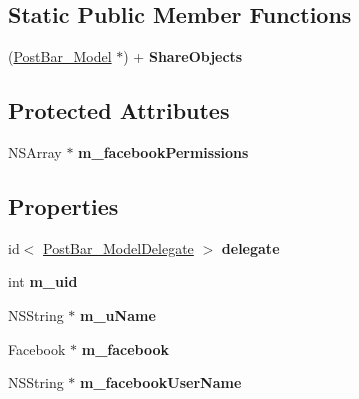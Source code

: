 \subsection*{Static Public Member Functions}
\begin{DoxyCompactItemize}
\item 
\hypertarget{interface_post_bar___model_a351fa837fa5dc9f7eb2b19f847b9f0fe}{
(\hyperlink{interface_post_bar___model}{PostBar\_\-Model} $\ast$) + {\bfseries ShareObjects}}
\label{interface_post_bar___model_a351fa837fa5dc9f7eb2b19f847b9f0fe}

\end{DoxyCompactItemize}
\subsection*{Protected Attributes}
\begin{DoxyCompactItemize}
\item 
\hypertarget{interface_post_bar___model_aaa568d989f7547276821822828e61660}{
NSArray $\ast$ {\bfseries m\_\-facebookPermissions}}
\label{interface_post_bar___model_aaa568d989f7547276821822828e61660}

\end{DoxyCompactItemize}
\subsection*{Properties}
\begin{DoxyCompactItemize}
\item 
\hypertarget{interface_post_bar___model_aada6f066df26bb88055490294526bcdd}{
id$<$ \hyperlink{protocol_post_bar___model_delegate-p}{PostBar\_\-ModelDelegate} $>$ {\bfseries delegate}}
\label{interface_post_bar___model_aada6f066df26bb88055490294526bcdd}

\item 
\hypertarget{interface_post_bar___model_a2c0d71d72d27e522f432c2cbd529b7b8}{
int {\bfseries m\_\-uid}}
\label{interface_post_bar___model_a2c0d71d72d27e522f432c2cbd529b7b8}

\item 
\hypertarget{interface_post_bar___model_a6f00d5629f13c7112e7181a898b1980b}{
NSString $\ast$ {\bfseries m\_\-uName}}
\label{interface_post_bar___model_a6f00d5629f13c7112e7181a898b1980b}

\item 
\hypertarget{interface_post_bar___model_a9889b9f3dcd994d8ec43b0c760581fdf}{
Facebook $\ast$ {\bfseries m\_\-facebook}}
\label{interface_post_bar___model_a9889b9f3dcd994d8ec43b0c760581fdf}

\item 
\hypertarget{interface_post_bar___model_abe35eaf80e703e87a3fd7d62ded0cdf6}{
NSString $\ast$ {\bfseries m\_\-facebookUserName}}
\label{interface_post_bar___model_abe35eaf80e703e87a3fd7d62ded0cdf6}

\end{DoxyCompactItemize}


